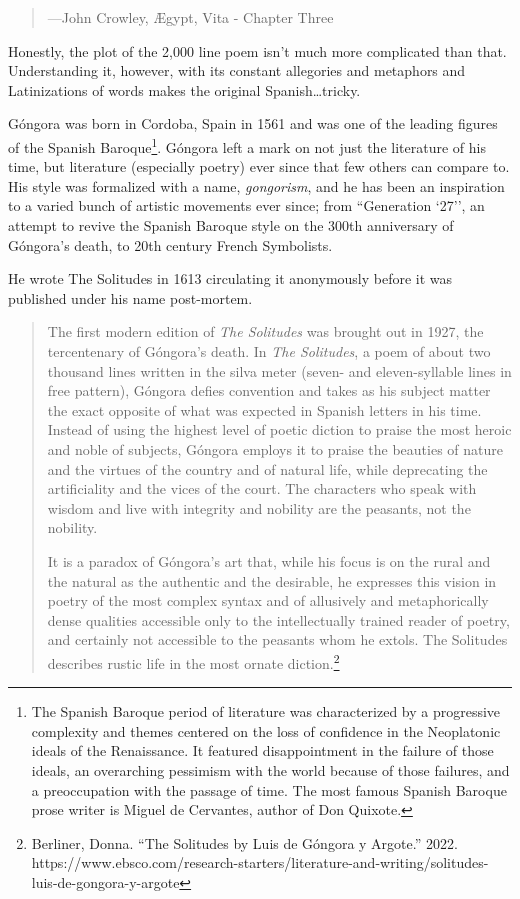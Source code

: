 \documentclass[10pt,makeidx]{extreport}
\begin{document}
\begin{tcolorbox}[breakout, title={The Solitudes of Luis Góngora}]
\begin{quote}
—John Crowley, Ægypt, Vita - Chapter Three
\end{quote}

Honestly, the plot of the 2,000 line poem isn't much more complicated than that. Understanding it, however, with its constant allegories and metaphors and Latinizations of words makes the original Spanish\ldots tricky.

Góngora was born in Cordoba, Spain in 1561 and was one of the leading figures of the Spanish Baroque\footnote{The Spanish Baroque period of literature was characterized by a progressive complexity and themes centered on the loss of confidence in the Neoplatonic ideals of the Renaissance. It featured disappointment in the failure of those ideals, an overarching pessimism with the world because of those failures, and a preoccupation with the passage of time. The most famous Spanish Baroque prose writer is Miguel de Cervantes, author of Don Quixote.}. Góngora left a mark on not just the literature of his time, but literature (especially poetry) ever since that few others can compare to. His style was formalized with a name, \textit{gongorism}, and he has been an inspiration to a varied bunch of artistic movements ever since; from ``Generation `27'', an attempt to revive the Spanish Baroque style on the 300th anniversary of Góngora's death, to 20th century French Symbolists. 

He wrote The Solitudes in 1613 circulating it anonymously before it was published under his name post-mortem.

\begin{quote}
The first modern edition of \textit{The Solitudes} was brought out in 1927, the tercentenary of Góngora's death. In \textit{The Solitudes}, a poem of about two thousand lines written in the silva meter (seven- and eleven-syllable lines in free pattern), Góngora defies convention and takes as his subject matter the exact opposite of what was expected in Spanish letters in his time. Instead of using the highest level of poetic diction to praise the most heroic and noble of subjects, Góngora employs it to praise the beauties of nature and the virtues of the country and of natural life, while deprecating the artificiality and the vices of the court. The characters who speak with wisdom and live with integrity and nobility are the peasants, not the nobility.

It is a paradox of Góngora's art that, while his focus is on the rural and the natural as the authentic and the desirable, he expresses this vision in poetry of the most complex syntax and of allusively and metaphorically dense qualities accessible only to the intellectually trained reader of poetry, and certainly not accessible to the peasants whom he extols. The Solitudes describes rustic life in the most ornate diction.\footnote{Berliner, Donna. ``The Solitudes by Luis de Góngora y Argote.'' 2022. https://www.ebsco.com/research-starters/literature-and-writing/solitudes-luis-de-gongora-y-argote}
\end{quote}


\end{tcolorbox}
\end{document}
